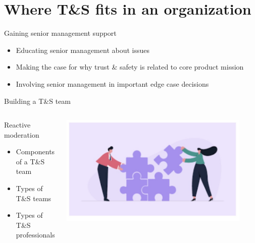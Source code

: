 \documentclass[nobackground,dvipsnames,table]{beamer}
\begin{document}
\section{Where T\&S fits in an organization}

\begin{frame}{Gaining senior management support}
	\begin{itemize}
		\item Educating senior management about issues
		\item Making the case for why trust \& safety is related to core product mission
		\item Involving senior management in important edge case decisions
	\end{itemize}
\end{frame}

\begin{frame}{Building a T\&S team}
	\begin{columns}
		\begin{column}{0.5\textwidth}  %
			Reactive moderation
			\begin{itemize}
				\item Components of a T\&S team
				\item Types of T\&S teams
				\item Types of T\&S professionals
			\end{itemize}
		\end{column}
		\begin{column}{0.5\textwidth}
			\begin{center}
				\includegraphics[width=0.9\textwidth]{img/puzzle.jpg}
			\end{center}
		\end{column}
	\end{columns}
\end{frame}
\end{document}
